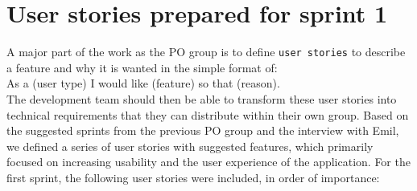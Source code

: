 \section{User stories prepared for sprint 1}
A major part of the work as the PO group is to define \texttt{user stories} to describe a feature and why it is wanted in the simple format of:
\\
As a (user type) I would like (feature) so that (reason).
\\
The development team should then be able to transform these user stories into technical requirements that they can distribute within their own group.
Based on the suggested sprints from the previous PO group and the interview with Emil, we defined a series of user stories with suggested features, which primarily focused on increasing usability and the user experience of the application.
For the first sprint, the following user stories were included, in order of importance:

